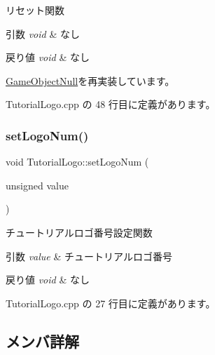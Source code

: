リセット関数 


\begin{DoxyParams}{引数}
{\em void} & なし \\
\hline
\end{DoxyParams}

\begin{DoxyRetVals}{戻り値}
{\em void} & なし \\
\hline
\end{DoxyRetVals}


\mbox{\hyperlink{class_game_object_null_a26a748e17ea31b987249022562f5198c}{Game\+Object\+Null}}を再実装しています。



 Tutorial\+Logo.\+cpp の 48 行目に定義があります。

\mbox{\label{class_tutorial_logo_a6f21283935bf1deed19fec1412eabd72}} 
\subsubsection{\texorpdfstring{set\+Logo\+Num()}{setLogoNum()}}
{\footnotesize\ttfamily void Tutorial\+Logo\+::set\+Logo\+Num (\begin{DoxyParamCaption}\item[{unsigned}]{value }\end{DoxyParamCaption})}



チュートリアルロゴ番号設定関数 


\begin{DoxyParams}{引数}
{\em value} & チュートリアルロゴ番号 \\
\hline
\end{DoxyParams}

\begin{DoxyRetVals}{戻り値}
{\em void} & なし \\
\hline
\end{DoxyRetVals}


 Tutorial\+Logo.\+cpp の 27 行目に定義があります。



\subsection{メンバ詳解}
\mbox{\label{class_tutorial_logo_a8027b42e33a036e88277c4cd17fabdaa}} 
